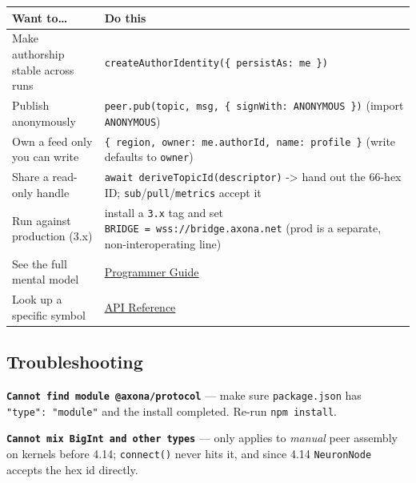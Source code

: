 \documentclass[
  nobib]{tufte-handout}
\newcounter{none} %
\begin{document}
{\def\LTcaptype{none} %
\begin{longtable}[]{@{}
  >{\raggedright\arraybackslash}p{}
  >{\raggedright\arraybackslash}p{}@{}}
\toprule\noalign{}
\begin{minipage}[b]{\linewidth}\raggedright
Want to\ldots{}
\end{minipage} & \begin{minipage}[b]{\linewidth}\raggedright
Do this
\end{minipage} \\
\midrule\noalign{}
\endhead
\bottomrule\noalign{}
\endlastfoot
Make authorship stable across runs &
\texttt{createAuthorIdentity(\{\ persistAs:\ \textquotesingle{}me\textquotesingle{}\ \})} \\
Publish anonymously &
\texttt{peer.pub(topic,\ msg,\ \{\ signWith:\ ANONYMOUS\ \})} (import
\texttt{ANONYMOUS}) \\
Own a feed only you can write &
\texttt{\{\ region,\ owner:\ me.authorId,\ name:\ \textquotesingle{}profile\textquotesingle{}\ \}}
(write defaults to
\texttt{\textquotesingle{}owner\textquotesingle{}}) \\
Share a read-only handle & \texttt{await\ deriveTopicId(descriptor)}
-\textgreater{} hand out the 66-hex ID;
\texttt{sub}/\texttt{pull}/\texttt{metrics} accept it \\
Run against production (3.x) & install a \texttt{3.x} tag and set
\texttt{BRIDGE\ =\ \textquotesingle{}wss://bridge.axona.net\textquotesingle{}}
(prod is a separate, non-interoperating line) \\
See the full mental model &
\href{Axona-Programmer-Guide-v4.16.0.md}{Programmer Guide} \\
Look up a specific symbol & \href{Axona-API-Reference-v4.16.0.md}{API
Reference} \\
\end{longtable}
}

\subsection{Troubleshooting}\label{troubleshooting}

\textbf{\texttt{Cannot\ find\ module\ \textquotesingle{}@axona/protocol\textquotesingle{}}}
--- make sure \texttt{package.json} has \texttt{"type":\ "module"} and
the install completed. Re-run \texttt{npm\ install}.

\textbf{\texttt{Cannot\ mix\ BigInt\ and\ other\ types}} --- only
applies to \emph{manual} peer assembly on kernels before 4.14;
\texttt{connect()} never hits it, and since 4.14 \texttt{NeuronNode}
accepts the hex id directly.
\end{document}
